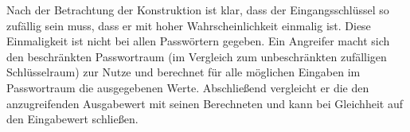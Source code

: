 \documentclass[a4paper]{uebungsblatt}
\begin{document}
\begin{aufgabe}[a]
	\teilaufgabe
	Nach der Betrachtung der Konstruktion ist klar, dass der Eingangsschl\"ussel so zuf\"allig sein muss, dass er mit hoher Wahrscheinlichkeit einmalig ist. Diese Einmaligkeit ist nicht bei allen Passw\"ortern gegeben. Ein Angreifer macht sich den beschr\"ankten Passwortraum (im Vergleich zum unbeschr\"ankten zuf\"alligen Schl\"usselraum) zur Nutze und berechnet f\"ur alle m\"oglichen Eingaben im Passwortraum die ausgegebenen Werte. Abschlie{\ss}end vergleicht er die den anzugreifenden Ausgabewert mit seinen Berechneten und kann bei Gleichheit auf den Eingabewert schlie{\ss}en.

\end{aufgabe}
\end{document}
